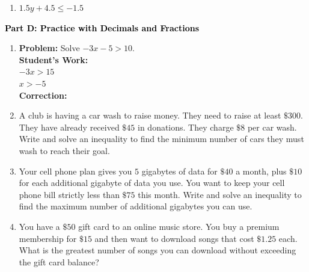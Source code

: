 \documentclass[12pt, letterpaper, fleqn]{article}
\begin{document}
\begin{enumerate}[itemsep=4.2cm, leftmargin=0.6cm, resume]
\item $1.5y + 4.5 \le -1.5$ \\
\end{enumerate}

\newpage

\begin{tcolorbox}[colback=customteal!20]
\large\textcolor{black}{\textbf{Part D: Practice with Decimals and Fractions}}
\end{tcolorbox}

\vspace{3mm}

\begin{enumerate}[itemsep=4.2cm, leftmargin=0.6cm, resume]
\item \textbf{Problem:} Solve $-3x - 5 > 10$.\\
\textbf{Student's Work:} \\
$-3x > 15$\\
$x > -5$\\
\textbf{Correction:}
\item A club is having a car wash to raise money. They need to raise at least $\$300$. They have already received $\$45$ in donations. They charge $\$8$ per car wash. Write and solve an inequality to find the minimum number of cars they must wash to reach their goal.
\item Your cell phone plan gives you $5$ gigabytes of data for $\$40$ a month, plus $\$10$ for each additional gigabyte of data you use. You want to keep your cell phone bill strictly less than $\$75$ this month. Write and solve an inequality to find the maximum number of additional gigabytes you can use.
\item You have a $\$50$ gift card to an online music store. You buy a premium membership for $\$15$ and then want to download songs that cost $\$1.25$ each. What is the greatest number of songs you can download without exceeding the gift card balance?
\end{enumerate}
\end{document}
